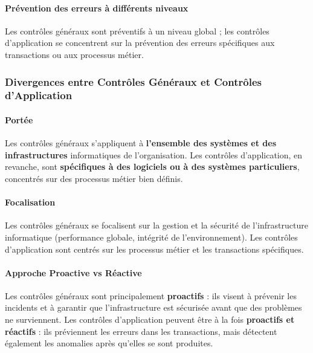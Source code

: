 \paragraph{Prévention des erreurs à différents niveaux}
Les contrôles généraux sont préventifs à un niveau global ; les contrôles d'application
se concentrent sur la prévention des erreurs spécifiques aux transactions ou aux
processus métier.

\subsubsection{Divergences entre Contrôles Généraux et Contrôles d'Application}

\paragraph{Portée}
Les contrôles généraux s'appliquent à \textbf{l'ensemble des systèmes et des
infrastructures} informatiques de l'organisation. Les contrôles d'application, en
revanche, sont \textbf{spécifiques à des logiciels ou à des systèmes particuliers},
concentrés sur des processus métier bien définis.

\paragraph{Focalisation}
Les contrôles généraux se focalisent sur la gestion et la sécurité de l'infrastructure
informatique (performance globale, intégrité de l'environnement). Les contrôles
d'application sont centrés sur les processus métier et les transactions spécifiques.

\paragraph{Approche Proactive vs Réactive}
Les contrôles généraux sont principalement \textbf{proactifs} : ils visent à prévenir
les incidents et à garantir que l'infrastructure est sécurisée avant que des problèmes
ne surviennent. Les contrôles d'application peuvent être à la fois \textbf{proactifs et
réactifs} : ils préviennent les erreurs dans les transactions, mais détectent également
les anomalies après qu'elles se sont produites.

